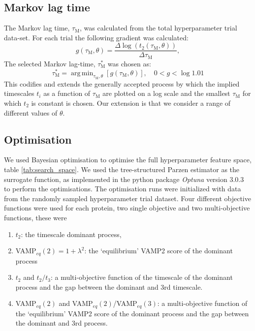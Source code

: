 \documentclass[journal=jacsat,manuscript=article]{achemso}
\DeclareMathOperator*{\argmin}{arg\,min}
\begin{document}
\subsection{Markov lag time}
The Markov lag time, $\tau_{\mathrm{M}}$, was calculated from the total hyperparameter trial data-set. For each trial the following gradient was calculated:
\begin{equation}
    g(\tau_{\mathrm{M}}, \theta) = \frac{\Delta \log{\left(t_{2}(\tau_{\mathrm{M}}, \theta)\right)}}{\Delta \tau_{\mathrm{M}}}, 
\end{equation}\label{eqn:choose_lag_1}
The selected Markov lag-time, $\tau^{*}_{\mathrm{M}}$ was chosen as:
\begin{equation}
    \tau^{*}_{\mathrm{M}}  = \argmin_{\tau_{\mathrm{M}}, \theta}\left[g(\tau_{\mathrm{M}}, \theta)\right], \quad 0 < g < \log{1.01}
\end{equation}\label{eqn:choose_lag_2}
This codifies and extends the generally accepted process by which the implied timescales $t_{i}$ as a function of $\tau_{\mathrm{M}}$ are plotted on a log scale and the smallest $\tau_{\mathrm{M}}$ for which $t_{2}$ is constant is chosen. Our extension is that we consider a range of different values of $\theta$. 


\subsection{Optimisation}

We used Bayesian optimisation to optimise the full hyperparameter feature space, table \ref{tab:search_space}. We used the tree-structured Parzen estimator as the surrogate function, as implemented in the python package \textit{Optuna} version 3.0.3 \cite{akiba_optuna_2019} to perform the optimisations. The optimisation runs were initialized with data from the randomly sampled hyperparameter trial dataset. Four different objective functions were used for each protein, two single objective and two multi-objective functions, these were 
\begin{enumerate}
    \item $t_2$: the timescale dominant process, 
    \item VAMP$_{eq}(2) = 1+\lambda^{2}$: the `equilibrium' VAMP2 score of the dominant process
    \item $t_2$ and $t_{2}/t_{3}$: a multi-objective function of the timescale of the dominant process and the gap between the dominant and 3rd timescale. 
    \item VAMP$_{eq}(2)$ and VAMP$_{eq}(2)$/VAMP$_{eq}(3)$: a multi-objective function of the `equilibrium' VAMP2 score of the dominant process and the gap between the dominant and 3rd process. 
\end{enumerate}
\end{document}
